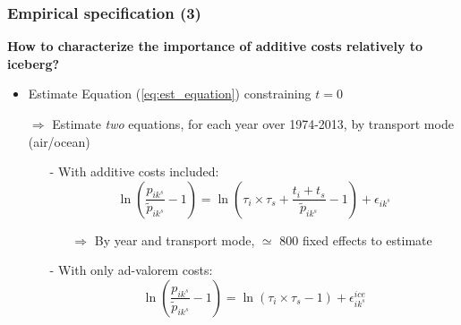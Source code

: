 \documentclass[10 pt,Helvetica, french]{beamer}
\begin{document}
\begin{frame}
\frametitle{Empirical specification (3)}
\textbf{How to characterize the importance of additive costs relatively to iceberg?} \vspace{0.1cm}
\begin{itemize}
\item Estimate Equation (\ref{eq:est_equation}) constraining $t=0$ \vspace{0.1cm}
\item[$\Rightarrow$] Estimate \textit{two} equations, for each year over 1974-2013, by transport mode (air/ocean)\vspace{0.1cm}
\begin{itemize}
\item[-] With additive costs included:
\begin{equation}
\ln\left(\frac{p_{ik^s}}{\widetilde{p}_{ik^s}}-1 \right)= \ln \left(\tau_{i} \times \tau_{s}+\frac{t_{i} + t_{s}}{\widetilde{p}_{ik^s}}-1 \right) + \epsilon_{ik^s}
\end{equation}
\begin{itemize}
\item[$\Rightarrow$] By year and transport mode, $\simeq$ 800 fixed effects to estimate   \vspace{0.1cm}
\end{itemize}
\item[-] With only ad-valorem costs:
\begin{equation}
\ln\left(\frac{p_{ik^s}}{\widetilde{p}_{ik^s}}-1 \right)= \ln \left(\tau_{i} \times \tau_{s}-1 \right) + \epsilon^{ice}_{ik^s} \label{eq:model_nlI}
\end{equation}
\end{itemize}
\end{itemize}
\end{frame}
\end{document}
